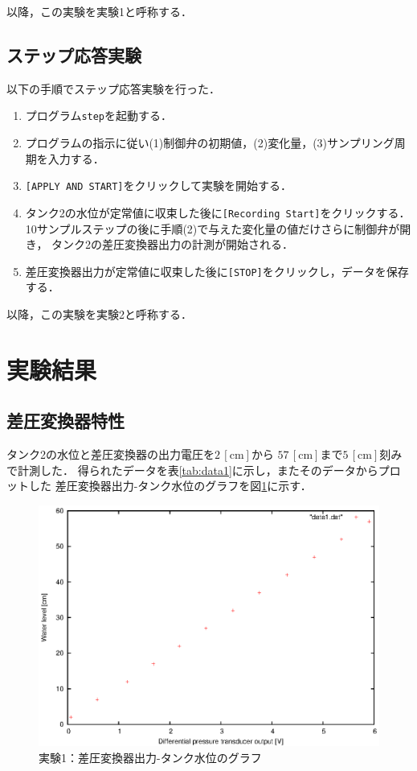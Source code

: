 \documentclass[11pt,a4paper]{jsarticle}
\begin{document}
以降，この実験を実験1と呼称する．

\subsection{ステップ応答実験}

以下の手順でステップ応答実験を行った．
\begin{enumerate}
  \item プログラム\texttt{step}を起動する．
  \item プログラムの指示に従い(1)制御弁の初期値，(2)変化量，(3)サンプリング周期を入力する．
  \item \texttt{[APPLY AND START]}をクリックして実験を開始する．
  \item タンク2の水位が定常値に収束した後に\texttt{[Recording Start]}をクリックする．
        10サンプルステップの後に手順(2)で与えた変化量の値だけさらに制御弁が開き，
        タンク2の差圧変換器出力の計測が開始される．
  \item 差圧変換器出力が定常値に収束した後に\texttt{[STOP]}をクリックし，データを保存する．
\end{enumerate}

以降，この実験を実験2と呼称する．

\section{実験結果}
\setcounter{equation}{0}
\setcounter{figure}{0}
\setcounter{table}{0}

\subsection{差圧変換器特性}

タンク2の水位と差圧変換器の出力電圧を$2 \,\mathrm{[cm]}$から
$57 \,\mathrm{[cm]}$まで$5 \,\mathrm{[cm]}$刻みで計測した．
得られたデータを表\ref{tab:data1}に示し，またそのデータからプロットした
差圧変換器出力-タンク水位のグラフを図\ref{fig:data1}に示す．



\begin{figure}[b]
  \begin{center}
    \includegraphics[width=0.9\hsize]{./data/data1.eps}
  \end{center}
  \caption{実験1：差圧変換器出力-タンク水位のグラフ}
  \label{fig:data1}
\end{figure}
\end{document}
